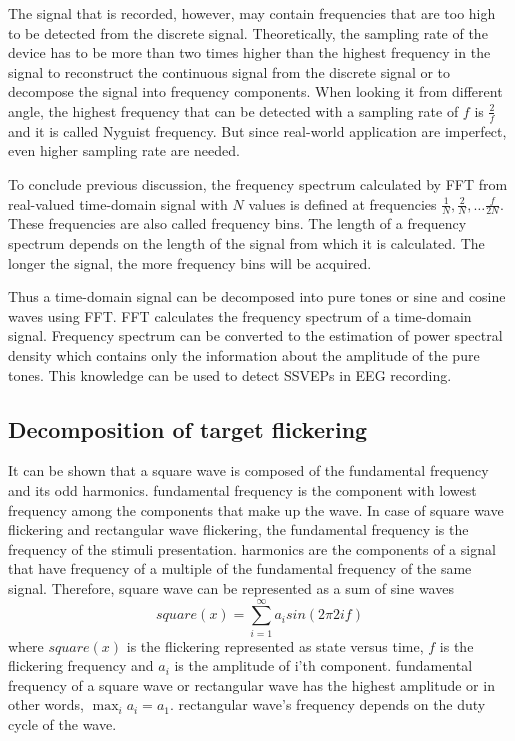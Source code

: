 The signal that is recorded, however, may contain frequencies that are too high to be detected from the discrete signal. Theoretically, the sampling rate of the device has to be more than two times higher than the highest frequency in the signal to reconstruct the continuous signal from the discrete signal or to decompose the signal into frequency components. When looking it from different angle, the highest frequency that can be detected with a sampling rate of $f$ is $\frac{2}{f}$ and it is called Nyguist frequency. But since real-world application are imperfect, even higher sampling rate are needed.

To conclude previous discussion, the frequency spectrum calculated by \gls{FFT} from real-valued time-domain signal with $N$ values is defined at frequencies $\frac{1}{N}, \frac{2}{N}, \dots\frac{f}{2N}$. These frequencies are also called frequency bins. The length of a frequency spectrum depends on the length of the signal from which it is calculated. The longer the signal, the more frequency bins will be acquired.

Thus a time-domain signal can be decomposed into pure tones or sine and cosine waves using \gls{FFT}. \gls{FFT} calculates the frequency spectrum of a time-domain signal. Frequency spectrum can be converted to the estimation of power spectral density which contains only the information about the amplitude of the pure tones. This knowledge can be used to detect \glspl{SSVEP} in \gls{EEG} recording.



\subsection{Decomposition of target flickering}

It can be shown that a square wave is composed of the \gls{fundamental} frequency and its odd \glspl{harmonic}. \Gls{fundamental} frequency is the component with lowest frequency among the components that make up the wave. In case of \gls{square wave} \gls{flickering} and \gls{rectangular wave} \gls{flickering}, the \gls{fundamental} frequency is the frequency of the stimuli presentation. \Glspl{harmonic} are the components of a signal that have frequency of a multiple of the fundamental frequency of the same signal. Therefore, \gls{square wave} can be represented as a sum of sine waves
\begin{equation}
	\label{eq:square}
	square(x) = \sum_{i=1}^{\infty}a_i sin(2\pi 2if)
\end{equation}
where $square(x)$ is the flickering represented as state versus time, $f$ is the flickering frequency and $a_i$ is the amplitude of i'th component. \Gls{fundamental} frequency of a square wave or rectangular wave has the highest amplitude or in other words, $\max_i a_i=a_1$. \Gls{rectangular wave}'s frequency depends on the \gls{duty cycle} of the wave.

